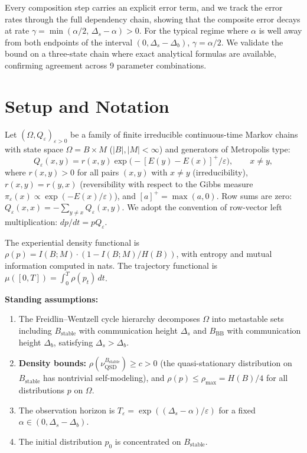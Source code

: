\documentclass[11pt]{article}
\newcommand{\eps}{\varepsilon}
\newcommand{\Ds}{\Delta_s}
\newcommand{\Db}{\Delta_b}
\newcommand{\Bstable}{B_{\mathrm{stable}}}
\newcommand{\BBB}{B_{\mathrm{BB}}}
\newcommand{\Teps}{T_\eps}
\newcommand{\QSD}{\mathrm{QSD}}
\begin{document}
Every composition step carries an explicit error term, and we track
the error rates through the full dependency chain, showing that the
composite error decays at rate
$\gamma = \min(\alpha/2,\, \Ds - \alpha) > 0$.
For the typical regime where $\alpha$ is well away from both endpoints
of the interval $(0, \Ds - \Db)$, $\gamma = \alpha/2$.  We validate
the bound on a three-state chain where exact analytical formulas are
available, confirming agreement across 9 parameter combinations.

\section{Setup and Notation}
\label{sec:setup}

Let $(\Omega, Q_\eps)_{\eps > 0}$ be a family of finite irreducible
continuous-time Markov chains with state space
$\Omega = B \times M$ ($|B|, |M| < \infty$) and generators of
Metropolis type:
\begin{equation}\label{eq:metropolis}
  Q_\eps(x,y) = r(x,y) \exp\!\bigl(-[E(y) - E(x)]^+ / \eps\bigr),
  \qquad x \neq y,
\end{equation}
where $r(x,y) > 0$ for all pairs $(x,y)$ with $x \neq y$
(irreducibility), $r(x,y) = r(y,x)$ (reversibility with respect to
the Gibbs measure
$\pi_\eps(x) \propto \exp(-E(x)/\eps)$), and $[a]^+ = \max(a, 0)$.
Row sums are zero: $Q_\eps(x,x) = -\sum_{y \neq x} Q_\eps(x,y)$.
We adopt the convention of row-vector left multiplication:
$dp/dt = pQ_\eps$.

The experiential density functional is
$\rho(p) = I(B;M) \cdot (1 - I(B;M)/H(B))$,
with entropy and mutual information computed in nats.
The trajectory functional is
$\mu([0,T]) = \int_0^T \rho(p_t)\, dt$.

\medskip
\textbf{Standing assumptions:}
\begin{enumerate}[label=(A\arabic*)]
\item\label{A1} The Freidlin--Wentzell cycle hierarchy decomposes
  $\Omega$ into metastable sets including $\Bstable$ with
  communication height $\Ds$ and $\BBB$ with communication height
  $\Db$, satisfying $\Ds > \Db$.
\item\label{A2} \textbf{Density bounds:}
  $\rho(\nu_\QSD^{\Bstable}) \geq c > 0$
  (the quasi-stationary distribution on $\Bstable$ has nontrivial
  self-modeling), and $\rho(p) \leq \rho_{\max} = H(B)/4$ for all
  distributions $p$ on $\Omega$.
\item\label{A3} The observation horizon is
  $\Teps = \exp((\Ds - \alpha)/\eps)$ for a fixed
  $\alpha \in (0, \Ds - \Db)$.
\item\label{A4} The initial distribution $p_0$ is concentrated on
  $\Bstable$.
\end{enumerate}
\end{document}
